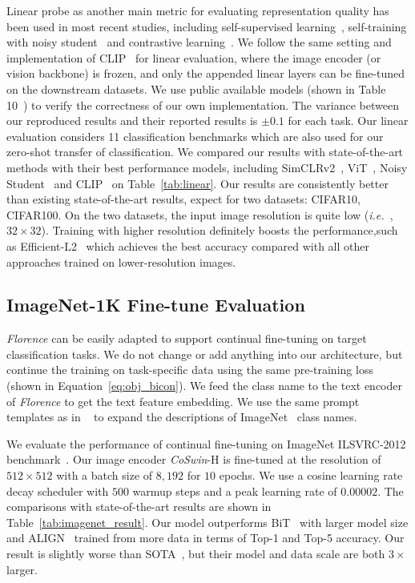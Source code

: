 \documentclass{article}
\newcommand{\ie}{{\it{i.e.}~}}
\begin{document}
Linear probe as another main metric for evaluating representation quality has been used in most
recent studies, including self-supervised learning~\cite{pmlr-v119-chen20j, chen2020big},
self-training with noisy student~\cite{Xie_2020_CVPR} and contrastive
learning~\cite{radford2021learning}. We follow the same setting and implementation of
CLIP~\cite{radford2021learning} for linear evaluation, where the image encoder (or vision backbone)
is frozen, and only the appended linear layers can be fine-tuned on the downstream datasets. We use public available models (shown in Table 10~\cite{radford2021learning}) to verify the correctness of our own implementation. The variance between our reproduced results and their reported results is $\pm 0.1$ for each task. Our linear evaluation considers 11 classification
benchmarks which are also used for our zero-shot transfer of classification. We compared our results with state-of-the-art methods with their best performance models, including SimCLRv2~\cite{chen2020big},
ViT~\cite{dosovitskiy2020vit}, Noisy Student~\cite{Xie_2020_CVPR} and
CLIP~\cite{radford2021learning} on Table~\ref{tab:linear}. Our results are consistently  better than
existing state-of-the-art results, expect for two datasets: CIFAR10, CIFAR100. On the two datasets, the input image
resolution is quite low (\ie, $32 \times 32$). Training with higher resolution definitely boosts the performance,such as  Efficient-L2~\cite{Xie_2020_CVPR} which achieves the best accuracy compared with all other approaches trained on lower-resolution images.

\subsection{ImageNet-1K Fine-tune Evaluation}
\label{sect:imagenet_finetune}

\emph{Florence} can be easily adapted to support continual fine-tuning on target classification
tasks. We do not change or add anything into our architecture, but continue the training on
task-specific data using the same pre-training loss (shown in Equation~\ref{eq:obj_bicon}). We feed the class name to the text
encoder of \emph{Florence} to get the text feature embedding. We use the same prompt templates as in
~\cite{radford2021learning, jia2021scaling} to expand the descriptions of
ImageNet~\cite{deng2009imagenet} class names.

We evaluate the performance of continual fine-tuning on ImageNet ILSVRC-2012
benchmark~\cite{deng2009imagenet}. Our image encoder \emph{CoSwin}-H is
fine-tuned at the resolution of $512\times512$ with a batch size of $8,192$ for $10$ epochs. We use a cosine learning rate decay scheduler with $500$ warmup steps and a peak learning rate of
$0.00002$. The comparisons with state-of-the-art results are shown in
Table~\ref{tab:imagenet_result}. Our model outperforms BiT~\cite{kolesnikov2020big} with larger model size and ALIGN~\cite{jia2021scaling} trained from more data in terms of Top-1 and Top-5 accuracy. Our result is slightly worse than SOTA~\cite{dai2021coatnet}, but their model and data scale are both $3\times$ larger.
\end{document}
